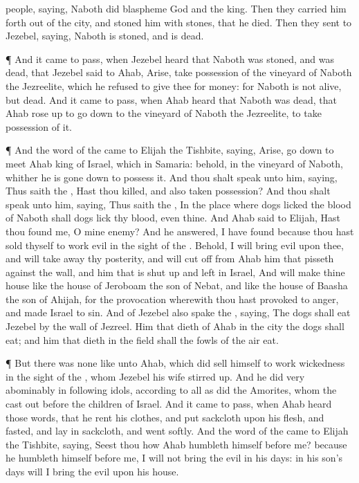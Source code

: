 {people,
saying,
Naboth did
blaspheme
God and the
king. Then they carried him
forth
out of the
city, and
stoned him with
stones, that he
died.
Then they
sent to
Jezebel,
saying,
Naboth is
stoned, and is
dead.
\par }{\PP {}¶ And it came to pass, when
Jezebel
heard that
Naboth was
stoned, and was
dead, that
Jezebel
said to
Ahab,
Arise, take
possession of the
vineyard of
Naboth the
Jezreelite, which he
refused to
give thee for
money: for
Naboth is not
alive, but
dead.
And it came to pass, when
Ahab
heard that
Naboth was
dead, that
Ahab rose
up to go
down to the
vineyard of
Naboth the
Jezreelite, to take
possession of it.
\par }{\PP {}¶ And the
word of the
{} came to
Elijah the
Tishbite,
saying,
Arise, go
down to
meet
Ahab
king of
Israel, which
{} in
Samaria: behold,
{} in the
vineyard of
Naboth, whither he is gone
down to
possess it.
And thou shalt
speak unto him,
saying, Thus
saith the
{}, Hast thou
killed, and also taken
possession? And thou shalt
speak unto him,
saying, Thus
saith the
{}, In the
place where
dogs
licked the
blood of
Naboth shall
dogs
lick thy
blood, even thine.
And
Ahab
said to
Elijah, Hast thou
found me, O mine
enemy? And he
answered, I have
found
{} because thou hast
sold thyself to
work
evil in the
sight of the
{}.
Behold, I will
bring
evil upon thee, and will take
away thy
posterity, and will cut
off from
Ahab him that
pisseth against the
wall, and him that is shut
up and
left in
Israel,
And will
make thine
house like the
house of
Jeroboam the
son of
Nebat, and like the
house of
Baasha the
son of
Ahijah, for the
provocation wherewith thou hast provoked
{} to
anger, and made
Israel to
sin.
And of
Jezebel also
spake the
{},
saying, The
dogs shall
eat
Jezebel by the
wall of
Jezreel.
Him that
dieth of
Ahab in the
city the
dogs shall
eat; and him that
dieth in the
field shall the
fowls of the
air
eat.
\par }{\PP {}¶ But there was none like unto
Ahab, which did
sell himself to
work
wickedness in the
sight of the
{}, whom
Jezebel his
wife stirred
up.
And he did
very
abominably in
following
idols, according to all
{} as
did the
Amorites, whom the
{} cast
out
before the
children of
Israel.
And it came to pass, when
Ahab
heard those
words, that he
rent his
clothes, and
put
sackcloth upon his
flesh, and
fasted, and
lay in
sackcloth, and
went
softly.
And the
word of the
{} came to
Elijah the
Tishbite,
saying,
Seest thou how
Ahab
humbleth himself
before me?
because he
humbleth himself
before me, I will not
bring the
evil in his
days:
{} in his
son’s
days will I
bring the
evil upon his
house.

}
